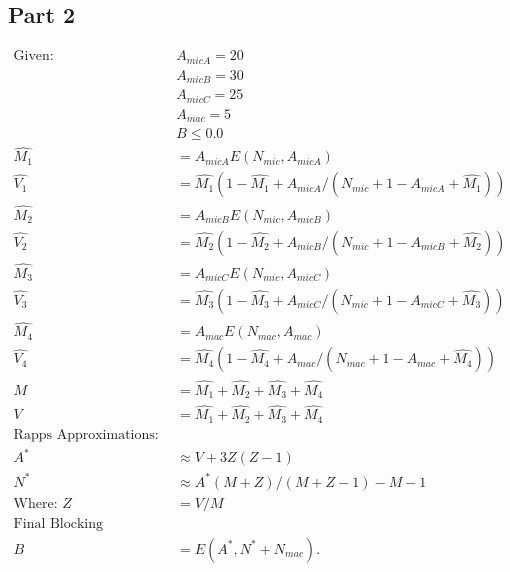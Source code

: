 \subsection{Part 2}

\begin{align*}
	\text{Given: } & A_{micA} = 20 \\
		       & A_{micB} = 30 \\
		       & A_{micC} = 25 \\
	               & A_{mac} = 5 \\
		       & B \le 0.0 \\
	\hat{M_1} &= A_{micA}E(N_{mic}, A_{micA}) \\
	\hat{V_1} &=
	\hat{M_1}(1-\hat{M_1}+A_{micA}/(N_{mic}+1-A_{micA}+\hat{M_1})) \\
	\hat{M_2} &= A_{micB}E(N_{mic}, A_{micB}) \\
	\hat{V_2} &=
	\hat{M_2}(1-\hat{M_2}+A_{micB}/(N_{mic}+1-A_{micB}+\hat{M_2})) \\
	\hat{M_3} &= A_{micC}E(N_{mic}, A_{micC}) \\
	\hat{V_3} &=
	\hat{M_3}(1-\hat{M_3}+A_{micC}/(N_{mic}+1-A_{micC}+\hat{M_3})) \\
	\hat{M_4} &= A_{mac}E(N_{mac}, A_{mac}) \\
	\hat{V_4} &=
	\hat{M_4}(1-\hat{M_4}+A_{mac}/(N_{mac}+1-A_{mac}+\hat{M_4})) \\
	M &= \hat{M_1} + \hat{M_2} + \hat{M_3} + \hat{M_4} \\
	V &= \hat{M_1} + \hat{M_2} + \hat{M_3} + \hat{M_4} \\
	\text{Rapps Approximations: } \\
	A^* &\approx V + 3Z(Z-1) \\
	N^* &\approx A^* (M+Z)/(M+Z-1) - M - 1 \\
	\text{Where: } Z &= V/M \\
	\text{Final Blocking Probability: } \\
	B &= E(A^*, N^*+N_{mac})
.\end{align*}
